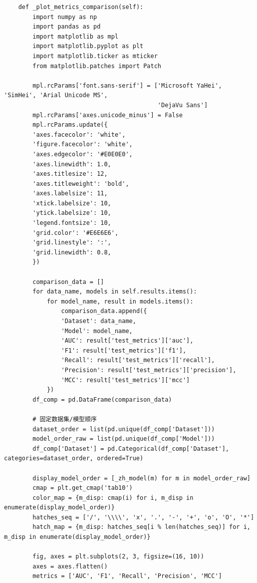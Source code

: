 \begin{lstlisting}
    def _plot_metrics_comparison(self):
        import numpy as np
        import pandas as pd
        import matplotlib as mpl
        import matplotlib.pyplot as plt
        import matplotlib.ticker as mticker
        from matplotlib.patches import Patch

        mpl.rcParams['font.sans-serif'] = ['Microsoft YaHei', 'SimHei', 'Arial Unicode MS',
                                           'DejaVu Sans']
        mpl.rcParams['axes.unicode_minus'] = False
        mpl.rcParams.update({
        'axes.facecolor': 'white',
        'figure.facecolor': 'white',
        'axes.edgecolor': '#E0E0E0',
        'axes.linewidth': 1.0,
        'axes.titlesize': 12,
        'axes.titleweight': 'bold',
        'axes.labelsize': 11,
        'xtick.labelsize': 10,
        'ytick.labelsize': 10,
        'legend.fontsize': 10,
        'grid.color': '#E6E6E6',
        'grid.linestyle': ':',
        'grid.linewidth': 0.8,
        })

        comparison_data = []
        for data_name, models in self.results.items():
            for model_name, result in models.items():
                comparison_data.append({
                'Dataset': data_name,
                'Model': model_name,
                'AUC': result['test_metrics']['auc'],
                'F1': result['test_metrics']['f1'],
                'Recall': result['test_metrics']['recall'],
                'Precision': result['test_metrics']['precision'],
                'MCC': result['test_metrics']['mcc']
            })
        df_comp = pd.DataFrame(comparison_data)

        # 固定数据集/模型顺序
        dataset_order = list(pd.unique(df_comp['Dataset']))
        model_order_raw = list(pd.unique(df_comp['Model']))
        df_comp['Dataset'] = pd.Categorical(df_comp['Dataset'], categories=dataset_order, ordered=True)

        display_model_order = [_zh_model(m) for m in model_order_raw]
        cmap = plt.get_cmap('tab10')
        color_map = {m_disp: cmap(i) for i, m_disp in enumerate(display_model_order)}
        hatches_seq = ['/', '\\\\', 'x', '.', '-', '+', 'o', 'O', '*']
        hatch_map = {m_disp: hatches_seq[i % len(hatches_seq)] for i, m_disp in enumerate(display_model_order)}

        fig, axes = plt.subplots(2, 3, figsize=(16, 10))
        axes = axes.flatten()
        metrics = ['AUC', 'F1', 'Recall', 'Precision', 'MCC']


\end{lstlisting}
